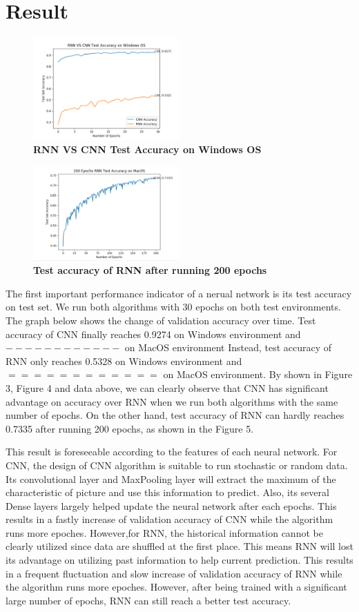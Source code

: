 \documentclass[letterpaper]{article} %
\begin{document}
\section{Result}
\begin{figure}[h!]
 \centering
  \includegraphics[width=0.5\textwidth]{RNN_CNN_Windows.jpg}
 \caption{\textbf{RNN VS CNN Test Accuracy on Windows OS}}
 \end{figure}
\begin{figure}[h!]
 \centering
  \includegraphics[width=0.5\textwidth]{RNN_200_MacOS.jpg}
 \caption{\textbf{Test accuracy of RNN after running 200 epochs}}
 \end{figure}
The first important performance indicator of a nerual network is its test accuracy on test set. We run both algorithms with 30 epochs on both test environments. The graph below shows the change of validation accuracy over time. Test accuracy of CNN finally reaches 0.9274 on Windows environment and $------------$ on MacOS environment  Instead, test accuracy of RNN only reaches 0.5328 on Windows environment and $============$ on MacOS environment. By shown in Figure 3, Figure 4 and data above, we can clearly observe that CNN has significant advantage on accuracy over RNN when we run both algorithms with the same number of epochs. On the other hand, test accuracy of RNN can hardly reaches 0.7335 after running 200 epochs, as shown in the Figure 5.

This result is foreseeable according to the features of each neural network. For CNN, the design of CNN algorithm is suitable to run stochastic or random data. Its convolutional layer and MaxPooling layer will extract the maximum of the characteristic of picture and use this information to predict. Also, its several Dense layers largely helped update the neural network after each epochs. This results in a fastly increase of validation accuracy of CNN while the algorithm runs more epoches. However,for RNN, the historical information cannot be clearly utilized since data are shuffled at the first place. This means RNN will lost its advantage on utilizing past information to help current prediction. This results in a frequent fluctuation and slow increase of validation accuracy of RNN while the algorithm runs more epoches. However, after being trained with a significant large number of epochs, RNN can still reach a better test accuracy.
\end{document}

